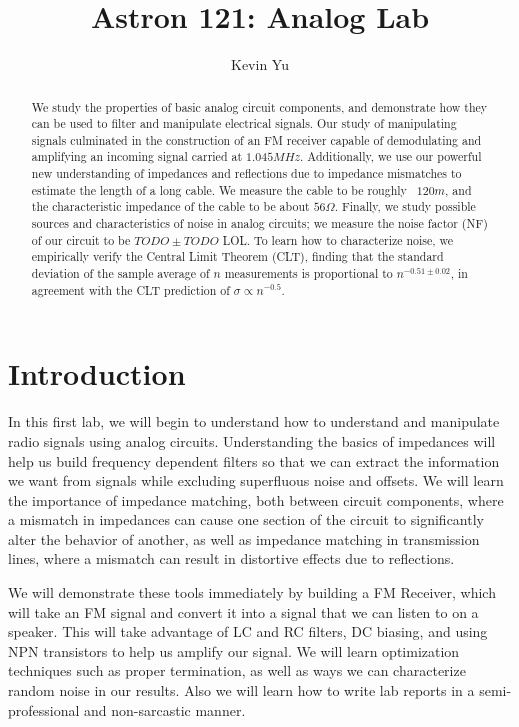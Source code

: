 \documentclass[12pt]{article}
\title {Astron 121: Analog Lab}
\author {
Kevin Yu
}
\begin{document}
\maketitle

\begin{abstract}
We study the properties of basic analog circuit components, and demonstrate how they can be used to filter and manipulate electrical signals. Our study of manipulating signals culminated in the construction of an FM receiver capable of demodulating and amplifying an incoming signal carried at $1.045MHz$. Additionally, we use our powerful new understanding of impedances and reflections due to impedance mismatches to estimate the length of a long cable. We measure the cable to be roughly ~$120m$, and the characteristic impedance of the cable to be about $56\Omega$. Finally, we study possible sources and characteristics of noise in analog circuits; we measure the noise factor (NF) of our circuit to be $TODO \pm TODO$ LOL. To learn how to characterize noise, we empirically verify the Central Limit Theorem (CLT), finding that the standard deviation of the sample average of $n$ measurements is proportional to $n^{-0.51\pm0.02}$, in agreement with the CLT prediction of $\sigma \propto n^{-0.5}$.
\end{abstract}

\section*{Introduction}
In this first lab, we will begin to understand how to understand and manipulate radio signals using analog circuits. Understanding the basics of impedances will help us build frequency dependent filters so that we can extract the information we want from signals while excluding superfluous noise and offsets. We will learn the importance of impedance matching, both between circuit components, where a mismatch in impedances can cause one section of the circuit to significantly alter the behavior of another, as well as impedance matching in transmission lines, where a mismatch can result in distortive effects due to reflections.

We will demonstrate these tools immediately by building a FM Receiver, which will take an FM signal and convert it into a signal that we can listen to on a speaker. This will take advantage of LC and RC filters, DC biasing, and using NPN transistors to help us amplify our signal. We will learn optimization techniques such as proper termination, as well as ways we can characterize random noise in our results. Also we will learn how to write lab reports in a semi-professional and non-sarcastic manner.
\end{document}
